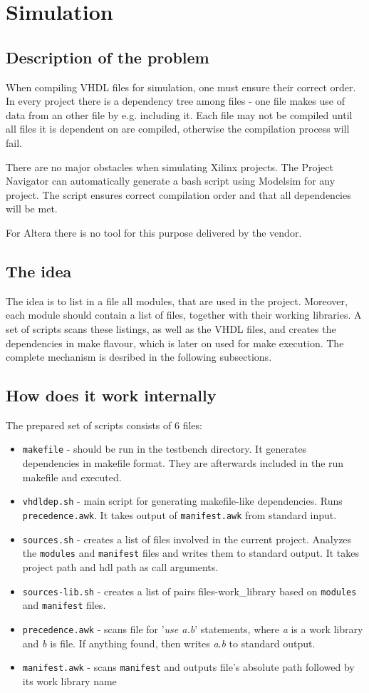 \documentclass[a4paper,10pt]{article}
\begin{document}
\section{Simulation}
\subsection{Description of the problem}
When compiling VHDL files for simulation, one must ensure their correct order. In every project there is a dependency tree among files - one file makes use of data from an other file by e.g. including it. Each file may not be compiled until all files it is dependent on are compiled, otherwise the compilation process will fail. 

There are no major obstacles when simulating Xilinx projects. The Project Navigator can automatically generate a bash script using Modelsim for any project. The script ensures correct compilation order and that all dependencies will be met.

For Altera there is no tool for this purpose delivered by the vendor. 
\subsection{The idea}
The idea is to list in a file all modules, that are used in the project. Moreover, each module should contain a list of files, together with their working libraries. A set of scripts scans these listings, as well as the VHDL files, and creates the dependencies in make flavour, which is later on used for make execution. The complete mechanism is desribed in the following subsections.
\subsection{How does it work internally}
The prepared set of scripts consists of 6 files:
\begin{itemize}
\item \verb!makefile! - should be run in the testbench directory. It generates dependencies in makefile format. They are afterwards included in the run makefile and executed.
\item \verb!vhdldep.sh! - main script for generating makefile-like dependencies. Runs \verb!precedence.awk!. It takes output of \verb!manifest.awk! from standard input.    
\item \verb!sources.sh! - creates a list of files involved in the current project. Analyzes the \verb!modules! and \verb!manifest! files and writes them to standard output. It takes project path and hdl path as call arguments. 
\item \verb!sources-lib.sh! - creates a list of pairs files-work\_library based on \verb!modules! and \verb!manifest! files.
\item \verb!precedence.awk! - scans file for '\textit{use a.b}' statements, where \textit{a} is a work library and \textit{b} is file. If anything found, then writes \textit{a}.\textit{b} to standard output.
\item \verb!manifest.awk! - scans \verb!manifest! and outputs file's absolute path followed by its work library name
\end{itemize}
\end{document}
